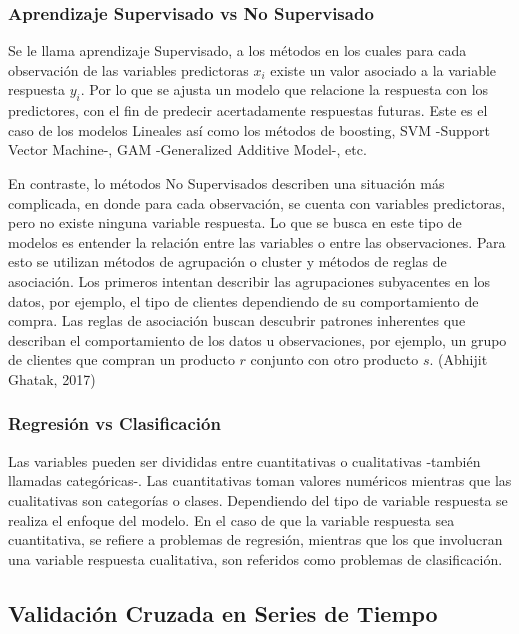 \documentclass[a4paper,12pt]{Latex/Classes/PhDthesisPSnPDF}
\begin{document}
\subsubsection{Aprendizaje Supervisado vs No Supervisado}

Se le llama aprendizaje Supervisado, a los métodos en los cuales para cada observación de las variables predictoras $x_{i}$ existe un valor asociado a la variable respuesta $y_{i}$. Por lo que se ajusta un modelo que relacione la respuesta con los predictores, con el fin de predecir acertadamente respuestas futuras. Este es el caso de los modelos Lineales así como los métodos de boosting, SVM -Support Vector Machine-, GAM -Generalized Additive Model-, etc. 

En contraste, lo métodos No Supervisados describen una situación más complicada, en donde para cada observación, se cuenta con variables predictoras, pero no existe ninguna variable respuesta. Lo que se busca en este tipo de modelos es entender la relación entre las variables o entre las observaciones. Para esto se utilizan métodos de agrupación o cluster y métodos de reglas de asociación. Los primeros intentan describir las agrupaciones subyacentes en los datos, por ejemplo, el tipo de clientes dependiendo de su comportamiento de compra. Las reglas de asociación buscan descubrir patrones inherentes que describan el comportamiento de los datos u observaciones, por ejemplo, un grupo de clientes que compran un producto $r$ conjunto con otro producto $s$. (Abhijit Ghatak, 2017)

\subsubsection{Regresión vs Clasificación}

Las variables pueden ser divididas entre cuantitativas o cualitativas -también llamadas categóricas-. Las cuantitativas toman valores numéricos mientras que las cualitativas son categorías o clases. Dependiendo del tipo de variable respuesta se realiza el enfoque del modelo. En el caso de que la variable respuesta sea cuantitativa, se refiere a problemas de regresión, mientras que los que involucran una variable respuesta cualitativa, son referidos como problemas de clasificación.


\subsection{Validación Cruzada en Series de Tiempo}
\end{document}
